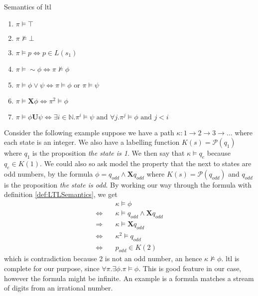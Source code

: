 \begin{definition}
\label{def:LTLSemantics}
Semantics of \acrshort{ltl}
\begin{enumerate}
    \item $\pi \vDash \top$
    \item $\pi \nvDash \bot$
    \item $\pi \vDash p \Leftrightarrow p \in L(s_1) $
    \item $\pi \vDash \sim \phi \Leftrightarrow \pi \nvDash \phi$
    \item $\pi \vDash \phi \vee \psi \Leftrightarrow \pi \vDash \phi\text{ or }\pi \vDash \psi$
    \item $\pi \vDash \mathbf{X} \phi \Leftrightarrow \pi^2 \vDash \phi$
    \item $\pi \vDash \phi \mathbf{U} \psi \Leftrightarrow \exists i\in \mathbb{N}.\pi^i \vDash \psi \text{ and } \forall j.  \pi^j \vDash \phi \text{ and } j < i$
\end{enumerate}
\end{definition}
Consider the following example suppose we have a path $\kappa: 1 \rightarrow 2 \rightarrow 3 \rightarrow \dots$   
where each state is an integer. We also have a labelling function $K(s) = \mathcal{P}({q_1})$ where $q_1$ is the proposition \emph{the state is 1}. We then say that $\kappa \vDash q_e$ because $q_e \in K(1)$.
We could also so ask model the property that the next to states are odd numbers, by the formula $\phi = q_{odd} \wedge \mathbf{X} q_{odd}$ where $K(s) = \mathcal{P}({q_{odd}})$ and $q_{odd}$ is the proposition \emph{the state is odd}.
By working our way through the formula with definition \ref{def:LTLSemantics}, we get
\begin{align*}
                            & \kappa \vDash \phi \\
    \Leftrightarrow \quad   & \kappa \vDash q_{odd} \wedge \mathbf{X} q_{odd} \\
    \Rightarrow     \quad   & \kappa \vDash \mathbf{X} q_{odd} \\ 
    \Leftrightarrow \quad   & \kappa^2 \vDash q_{odd} \\ 
    \Leftrightarrow \quad   & p_{odd} \in K(2)
\end{align*}  
which is contradiction because 2 is not an odd number, an hence $\kappa \nvDash \phi$.
\acrshort{ltl} is complete for our purpose, since $\forall \pi . \exists \phi . \pi \vDash \phi$. This is good feature in our case, however the formula might be infinite. An example is a formula matches a stream of digits from an irrational number.

